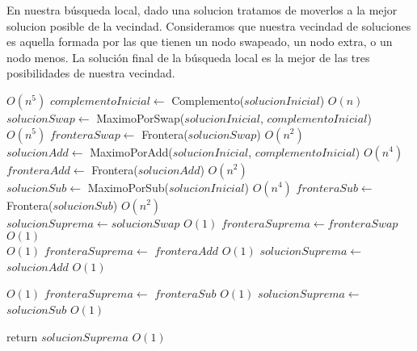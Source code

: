 En nuestra búsqueda local, dado una solucion tratamos de moverlos a la mejor solucion posible de la vecindad. Consideramos que nuestra vecindad de soluciones es aquella formada por las que tienen un nodo swapeado, un nodo extra, o un nodo menos. La solución final de la búsqueda local es la mejor de las tres posibilidades de nuestra vecindad. \\

\begin{algorithm}[H]
\begin{algorithmic}
             \Comment $O(n^5)$
    \State $complementoInicial \gets$ Complemento($solucionInicial$) \Comment $O(n)$\\

    \State $solucionSwap \gets$ MaximoPorSwap($solucionInicial$, $complementoInicial$)  \Comment $O(n^5)$
    \State $fronteraSwap \gets$ Frontera($solucionSwap$)                                \Comment $O(n^2)$ \\

    \State $solucionAdd \gets$ MaximoPorAdd($solucionInicial$, $complementoInicial$)    \Comment $O(n^4)$
    \State $fronteraAdd \gets$ Frontera($solucionAdd$)                                  \Comment $O(n^2)$\\

    \State $solucionSub \gets$ MaximoPorSub($solucionInicial$)      \Comment $O(n^4)$
    \State $fronteraSub \gets$ Frontera($solucionSub$)              \Comment $O(n^2)$\\

    \State $solucionSuprema \gets solucionSwap$ \Comment $O(1)$
    \State $fronteraSuprema \gets fronteraSwap$ \Comment $O(1)$\\

                    \Comment $O(1)$
        \State $fronteraSuprema \gets$ $fronteraAdd$    \Comment $O(1)$
        \State $solucionSuprema \gets$ $solucionAdd$    \Comment $O(1)$\\
    \EndIf

                    \Comment $O(1)$
        \State $fronteraSuprema \gets$ $fronteraSub$    \Comment $O(1)$
        \State $solucionSuprema \gets$ $solucionSub$    \Comment $O(1)$\\
    \EndIf

    \State return $solucionSuprema$                     \Comment $O(1)$
\EndFunction

\end{algorithmic}
\end{algorithm}


